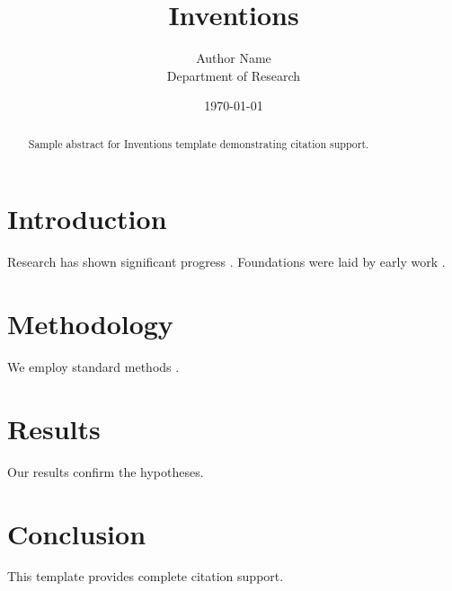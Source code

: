 \documentclass{mdpi}
\title{Inventions}
\author{Author Name \\ \small Department of Research}
\date{\today}
\begin{document}
\maketitle

\begin{abstract}
Sample abstract for Inventions template demonstrating citation support.
\end{abstract}

\section{Introduction}
Research has shown significant progress \citep{einstein1905}. Foundations were laid by early work \citep{turing1950}.

\section{Methodology}
We employ standard methods \citep{knuth1984}.

\section{Results}
Our results confirm the hypotheses.

\section{Conclusion}
This template provides complete citation support.



\end{document}

